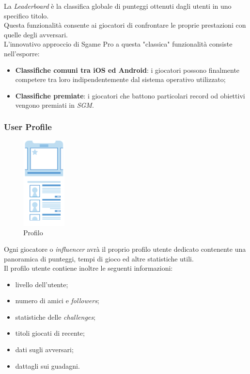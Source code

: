 \documentclass[11pt]{thesistemp}
\begin{document}
La \textit{Leaderboard} è la classifica globale di punteggi ottenuti dagli utenti in uno specifico titolo.\\
Questa funzionalità consente ai giocatori di confrontare le proprie prestazioni con quelle degli avversari.\\
L'innovativo approccio di Sgame Pro a questa "classica" funzionalità consiste nell'esporre:
\begin{itemize}
	\item \textbf{Classifiche comuni tra iOS ed Android}: i giocatori possono finalmente competere tra loro indipendentemente dal sistema operativo utilizzato;
	\item \textbf{Classifiche premiate}: i giocatori che battono particolari record od obiettivi vengono premiati in \textit{SGM}.
\end{itemize}

\subsubsection{User Profile}
\begin{figure}
	\vspace{-31pt}
	\begin{center}
    	\includegraphics[width=0.2\textwidth]{user-profile.png}
  	\end{center}
  	\vspace{-10pt}
  	\caption{Profilo}
  	\label{fig:user-profile}
  	\vspace{-60pt}
\end{figure}
Ogni giocatore o \textit{influencer} avrà il proprio profilo utente dedicato contenente una panoramica di punteggi, tempi di gioco ed altre statistiche utili.\\
Il profilo utente contiene inoltre le seguenti informazioni:
\begin{itemize}
	\item livello dell'utente;
	\item numero di amici e \textit{followers};
	\item statistiche delle \textit{challenges};
	\item titoli giocati di recente;
	\item dati sugli avversari;
	\item dattagli sui guadagni.
\end{itemize}
\pagebreak
\end{document}
